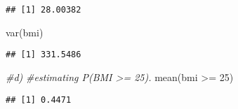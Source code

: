 \documentclass[
]{article}
\newenvironment{Shaded}{\begin{snugshade}}{\end{snugshade}}
\newcommand{\CommentTok}[1]{\textcolor[rgb]{0.56,0.35,0.01}{\textit{#1}}}
\newcommand{\DecValTok}[1]{\textcolor[rgb]{0.00,0.00,0.81}{#1}}
\newcommand{\FunctionTok}[1]{\textcolor[rgb]{0.00,0.00,0.00}{#1}}
\newcommand{\NormalTok}[1]{#1}
\newcommand{\SpecialCharTok}[1]{\textcolor[rgb]{0.00,0.00,0.00}{#1}}
\begin{document}
\begin{verbatim}
## [1] 28.00382
\end{verbatim}

\begin{Shaded}
\begin{Highlighting}[]
\FunctionTok{var}\NormalTok{(bmi)}
\end{Highlighting}
\end{Shaded}

\begin{verbatim}
## [1] 331.5486
\end{verbatim}

\begin{Shaded}
\begin{Highlighting}[]
\CommentTok{\#d)}
\CommentTok{\#estimating P(BMI \textgreater{}= 25).}
\FunctionTok{mean}\NormalTok{(bmi }\SpecialCharTok{\textgreater{}=} \DecValTok{25}\NormalTok{)}
\end{Highlighting}
\end{Shaded}

\begin{verbatim}
## [1] 0.4471
\end{verbatim}
\end{document}
